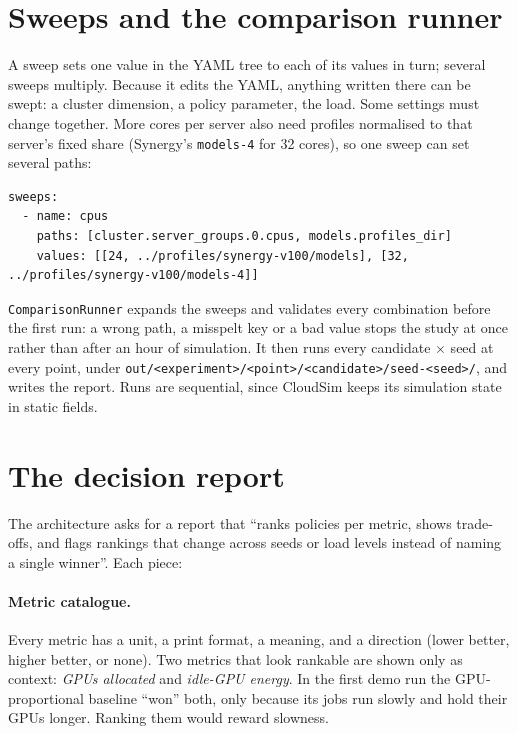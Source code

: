 \documentclass[11pt,a4paper]{article}
\newcommand{\code}[1]{\texttt{#1}}
\begin{document}
\section{Sweeps and the comparison runner}

A sweep sets one value in the YAML tree to each of its values in turn; several sweeps multiply. Because it
edits the YAML, anything written there can be swept: a cluster dimension, a policy parameter, the load. Some
settings must change together. More cores per server also need profiles normalised to that server's fixed
share (Synergy's \code{models-4} for 32 cores), so one sweep can set several paths:
\begin{lstlisting}
sweeps:
  - name: cpus
    paths: [cluster.server_groups.0.cpus, models.profiles_dir]
    values: [[24, ../profiles/synergy-v100/models], [32, ../profiles/synergy-v100/models-4]]
\end{lstlisting}
\code{ComparisonRunner} expands the sweeps and validates every combination before the first run: a wrong path,
a misspelt key or a bad value stops the study at once rather than after an hour of simulation. It then runs
every candidate $\times$ seed at every point, under \code{out/<experiment>/<point>/<candidate>/seed-<seed>/}, and
writes the report. Runs are sequential, since CloudSim keeps its simulation state in static fields.

\section{The decision report}

The architecture asks for a report that ``ranks policies per metric, shows trade-offs, and flags rankings that
change across seeds or load levels instead of naming a single winner''. Each piece:

\paragraph{Metric catalogue.} Every metric has a unit, a print format, a meaning, and a direction (lower better,
higher better, or none). Two metrics that look rankable are shown only as context: \emph{GPUs allocated} and
\emph{idle-GPU energy}. In the first demo run the GPU-proportional baseline ``won'' both, only because its jobs
run slowly and hold their GPUs longer. Ranking them would reward slowness.
\end{document}

